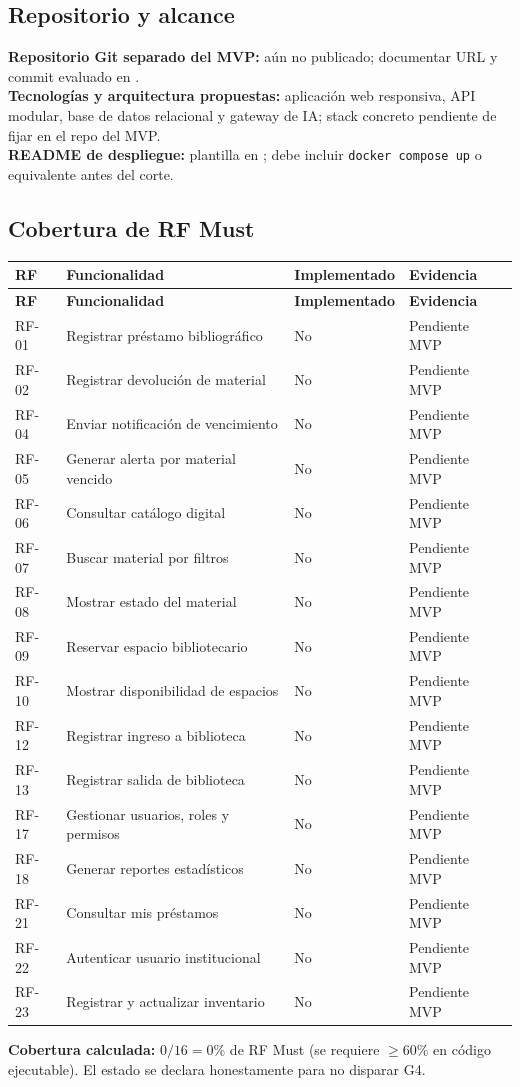 \documentclass[12pt,journal,onecolumn]{IEEEtran}
\begin{document}
\subsection{Repositorio y alcance}
\textbf{Repositorio Git separado del MVP:} aún no publicado; documentar URL y commit evaluado en .\\
\textbf{Tecnologías y arquitectura propuestas:} aplicación web responsiva, API modular, base de datos relacional y gateway de IA; stack concreto pendiente de fijar en el repo del MVP.\\
\textbf{README de despliegue:} plantilla en ; debe incluir \texttt{docker compose up} o equivalente antes del corte.

\subsection{Cobertura de RF Must}
\begin{longtable}{P{0.10\textwidth}P{0.36\textwidth}P{0.18\textwidth}P{0.28\textwidth}}\toprule
\textbf{RF} & \textbf{Funcionalidad} & \textbf{Implementado} & \textbf{Evidencia}\\\midrule\endfirsthead
\toprule\textbf{RF} & \textbf{Funcionalidad} & \textbf{Implementado} & \textbf{Evidencia}\\\midrule\endhead
RF-01 & Registrar préstamo bibliográfico & No & Pendiente MVP\\
RF-02 & Registrar devolución de material & No & Pendiente MVP\\
RF-04 & Enviar notificación de vencimiento & No & Pendiente MVP\\
RF-05 & Generar alerta por material vencido & No & Pendiente MVP\\
RF-06 & Consultar catálogo digital & No & Pendiente MVP\\
RF-07 & Buscar material por filtros & No & Pendiente MVP\\
RF-08 & Mostrar estado del material & No & Pendiente MVP\\
RF-09 & Reservar espacio bibliotecario & No & Pendiente MVP\\
RF-10 & Mostrar disponibilidad de espacios & No & Pendiente MVP\\
RF-12 & Registrar ingreso a biblioteca & No & Pendiente MVP\\
RF-13 & Registrar salida de biblioteca & No & Pendiente MVP\\
RF-17 & Gestionar usuarios, roles y permisos & No & Pendiente MVP\\
RF-18 & Generar reportes estadísticos & No & Pendiente MVP\\
RF-21 & Consultar mis préstamos & No & Pendiente MVP\\
RF-22 & Autenticar usuario institucional & No & Pendiente MVP\\
RF-23 & Registrar y actualizar inventario & No & Pendiente MVP\\
\bottomrule\end{longtable}
\textbf{Cobertura calculada:} $0/16 = 0\%$ de RF Must (se requiere $\geq 60\%$ en código ejecutable). El estado se declara honestamente para no disparar G4.
\end{document}
